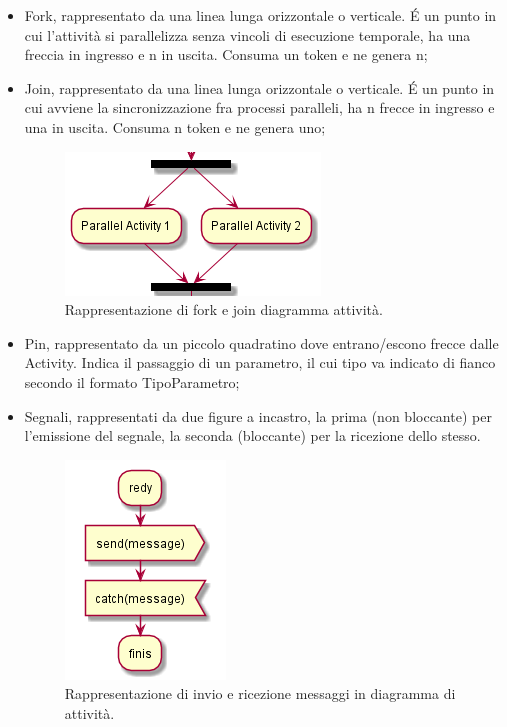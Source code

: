 \documentclass[NormeDiProgetto.tex]{subfiles}
\begin{document}
\begin{itemize}
\item Fork, rappresentato da una linea lunga orizzontale o verticale. \'E un punto in cui l'attività si parallelizza senza vincoli di esecuzione temporale, ha una freccia in ingresso e n in uscita. Consuma un token e ne genera n;
\item Join, rappresentato da una linea lunga orizzontale o verticale. \'E un punto in cui avviene la sincronizzazione fra processi paralleli, ha n frecce in ingresso e una in uscita. Consuma n token e ne genera uno;
\begin{figure}[h]
	\centering
	\includegraphics[width=0.4\linewidth]{progettazione/activityparall}
	\caption{Rappresentazione di fork e join diagramma attività.}
	\label{fig:activityparall}
\end{figure}

\item Pin, rappresentato da un piccolo quadratino dove entrano/escono frecce dalle Activity. Indica il passaggio di un parametro, il cui tipo va indicato di fianco secondo il formato TipoParametro;
\item Segnali, rappresentati da due figure a incastro, la prima (non bloccante) per
l'emissione del segnale, la seconda (bloccante) per la ricezione dello stesso.
\begin{figure}[h]
	\centering
	\includegraphics[width=0.3\linewidth]{progettazione/message}
	\caption{Rappresentazione di invio e ricezione messaggi in diagramma di attività.}
	\label{fig:message}
\end{figure}


\end{itemize}
\end{document}
